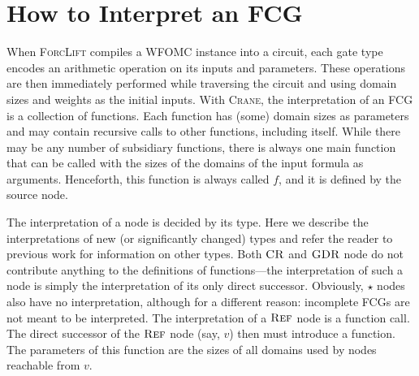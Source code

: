 \section{How to Interpret an FCG}\label{sec:interpret}

When \textsc{ForcLift} \citep{DBLP:conf/ijcai/BroeckTMDR11} compiles a WFOMC
instance into a circuit, each gate type encodes an arithmetic operation on its
inputs and parameters. These operations are then immediately performed while
traversing the circuit and using domain sizes and weights as the initial inputs.
With \textsc{Crane}, the interpretation of an FCG is a collection of functions.
Each function has (some) domain sizes as parameters and may contain recursive
calls to other functions, including itself. While there may be any number of
subsidiary functions, there is always one main function that can be called with
the sizes of the domains of the input formula as arguments. Henceforth, this
function is always called $f$, and it is defined by the source node.

The interpretation of a node is decided by its type. Here we describe the
interpretations of new (or significantly changed) types and refer the reader to
previous work \citep{DBLP:conf/ijcai/BroeckTMDR11} for information on other
types. Both $\operatorname{\textsc{CR}}$ and $\operatorname{\textsc{GDR}}$ node do not contribute anything to the definitions
of functions---the interpretation of such a node is simply the interpretation of
its only direct successor. Obviously, $\star$ nodes also have no interpretation,
although for a different reason: incomplete FCGs are not meant to be
interpreted. The interpretation of a $\operatorname{\textsc{Ref}}$ node is a function call. The direct
successor of the $\operatorname{\textsc{Ref}}$ node (say, $v$) then must introduce a function. The
parameters of this function are the sizes of all domains used by nodes reachable
from $v$.


